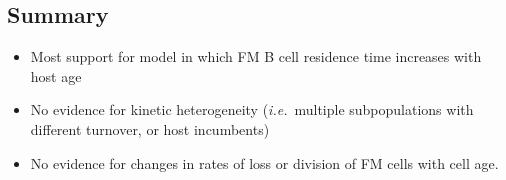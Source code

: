\documentclass[11pt]{article}
\newcommand{\red}[1]{{\color{red}{#1}}}
\newcommand{\ie}{\textit{i.e.}}
\newcommand{\khi}{Ki67$^\text{hi}$}
\newcommand{\klo}{Ki67$^\text{lo}$}
\begin{document}
	
	
	\subsection*{Summary}
	\begin{itemize}
		\item Most support for model in which FM B cell residence time increases with host age
		\item No evidence for kinetic heterogeneity (\ie\ multiple subpopulations with different turnover, or host incumbents) 
		\item No evidence for changes in rates of loss or division of FM cells with cell age.
	\end{itemize}
	
\end{document}
